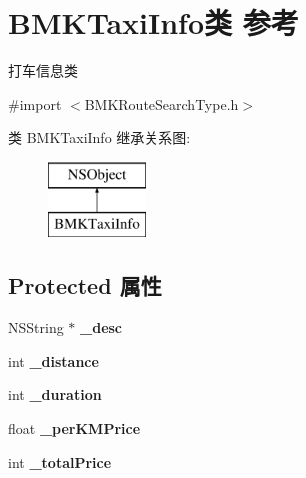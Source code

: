 \hypertarget{interface_b_m_k_taxi_info}{}\section{B\+M\+K\+Taxi\+Info类 参考}
\label{interface_b_m_k_taxi_info}


打车信息类  




{\ttfamily \#import $<$B\+M\+K\+Route\+Search\+Type.\+h$>$}

类 B\+M\+K\+Taxi\+Info 继承关系图\+:\begin{figure}[H]
\begin{center}
\leavevmode
\includegraphics[height=2.000000cm]{interface_b_m_k_taxi_info}
\end{center}
\end{figure}
\subsection*{Protected 属性}
\begin{DoxyCompactItemize}
\item 
\hypertarget{interface_b_m_k_taxi_info_a31a15f90f1d7d94ebe866dadc826275e}{}N\+S\+String $\ast$ {\bfseries \+\_\+desc}\label{interface_b_m_k_taxi_info_a31a15f90f1d7d94ebe866dadc826275e}

\item 
\hypertarget{interface_b_m_k_taxi_info_a034a523b6e5c546466efd26bf4d62327}{}int {\bfseries \+\_\+distance}\label{interface_b_m_k_taxi_info_a034a523b6e5c546466efd26bf4d62327}

\item 
\hypertarget{interface_b_m_k_taxi_info_a4c0577d1da6086b7ac19193476a83a45}{}int {\bfseries \+\_\+duration}\label{interface_b_m_k_taxi_info_a4c0577d1da6086b7ac19193476a83a45}

\item 
\hypertarget{interface_b_m_k_taxi_info_a6dbca9a1eb364b633b94ae7d58399a0b}{}float {\bfseries \+\_\+per\+K\+M\+Price}\label{interface_b_m_k_taxi_info_a6dbca9a1eb364b633b94ae7d58399a0b}

\item 
\hypertarget{interface_b_m_k_taxi_info_aed1f43a63f7121e98683b665fa7a6f6f}{}int {\bfseries \+\_\+total\+Price}\label{interface_b_m_k_taxi_info_aed1f43a63f7121e98683b665fa7a6f6f}

\end{DoxyCompactItemize}
